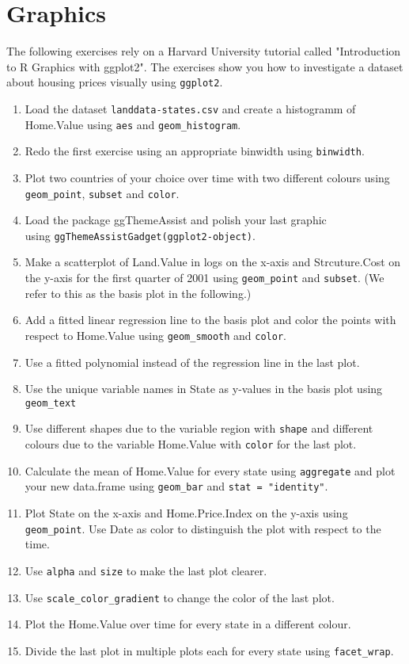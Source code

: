 \documentclass{article}
\begin{document}
\section{Graphics}
The following exercises rely on a Harvard University tutorial called "Introduction to R Graphics with ggplot2". The exercises show you how to investigate a dataset about housing prices visually using \texttt{ggplot2}. 
\begin{enumerate}
\item Load the dataset \texttt{landdata-states.csv} and create a histogramm of Home.Value using \texttt{aes} and \texttt{geom\_histogram}.
\item Redo the first exercise using an appropriate binwidth using \texttt{binwidth}.
\item Plot two countries of your choice over time  with two different colours using \texttt{geom\_point}, \texttt{subset} and \texttt{color}.
\item Load the package ggThemeAssist and 
polish your last graphic \\ using \texttt{ggThemeAssistGadget(ggplot2-object)}.
\item Make a scatterplot of Land.Value in logs on the x-axis and Strcuture.Cost on the y-axis for the first quarter of 2001 using \texttt{geom\_point} and \texttt{subset}. (We refer to this as the basis plot in the following.)
\item Add a fitted linear regression line to the basis plot and color the points with respect to Home.Value using \texttt{geom\_smooth} and \texttt{color}.
\item Use a fitted polynomial instead of the regression line in the last plot.
\item Use the unique variable names in State as y-values in the basis plot using \texttt{geom\_text}
\item Use different shapes due to the variable region with \texttt{shape} and different colours due to the variable Home.Value with \texttt{color} for the last plot.
\item Calculate the mean of Home.Value for every state using \texttt{aggregate} and plot your new data.frame using \texttt{geom\_bar} and \texttt{stat = "identity"}.
\item Plot State on the x-axis and Home.Price.Index on the y-axis using \texttt{geom\_point}. Use Date as color to distinguish the plot with respect to the time.
\item Use \texttt{alpha} and \texttt{size} to make the last plot clearer.
\item Use \texttt{scale\_color\_gradient} to change the color of the last plot.
\item Plot the Home.Value over time for every state in a different colour.
\item Divide the last plot in multiple plots each for every state using \texttt{facet\_wrap}.
\end{enumerate}
\end{document}
